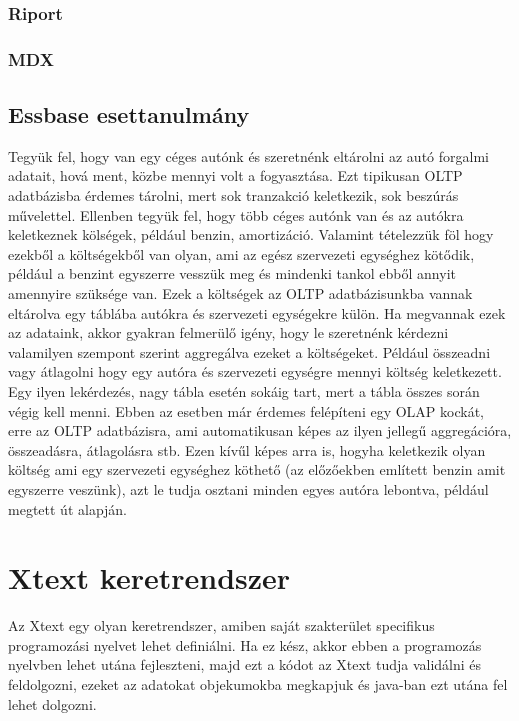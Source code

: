 \subsubsection{Riport}


\subsubsection{MDX}

\subsection{Essbase esettanulmány}
Tegyük fel, hogy van egy céges autónk és szeretnénk eltárolni az autó forgalmi adatait, hová ment, közbe mennyi volt a fogyasztása. Ezt tipikusan OLTP adatbázisba érdemes tárolni, mert sok tranzakció keletkezik, sok beszúrás művelettel. Ellenben tegyük fel, hogy több céges autónk van és az autókra keletkeznek kölségek, például benzin, amortizáció. Valamint tételezzük föl hogy ezekből a költségekből van olyan, ami az egész szervezeti egységhez kötődik, például a benzint egyszerre vesszük meg és mindenki tankol ebből annyit amennyire szüksége van. Ezek a költségek az OLTP adatbázisunkba vannak eltárolva egy táblába autókra és szervezeti egységekre külön. Ha megvannak ezek az adataink, akkor gyakran felmerülő igény, hogy le szeretnénk kérdezni valamilyen szempont szerint aggregálva ezeket a költségeket. Például összeadni vagy átlagolni hogy egy autóra és szervezeti egységre mennyi költség keletkezett. Egy ilyen lekérdezés, nagy tábla esetén sokáig tart, mert a tábla összes során végig kell menni.  Ebben az esetben már érdemes felépíteni egy OLAP kockát, erre az OLTP adatbázisra, ami automatikusan képes az ilyen jellegű aggregációra, összeadásra, átlagolásra stb. Ezen kívűl képes arra is, hogyha keletkezik olyan költség ami egy szervezeti egységhez köthető (az előzőekben említett benzin amit egyszerre veszünk), azt le tudja osztani minden egyes autóra lebontva, például megtett út alapján.

\section{Xtext keretrendszer}
Az Xtext egy olyan keretrendszer, amiben saját szakterület specifikus programozási nyelvet lehet definiálni. Ha ez kész, akkor ebben a programozás nyelvben lehet utána fejleszteni, majd ezt a kódot az Xtext tudja validálni és feldolgozni, ezeket az adatokat objekumokba megkapjuk és java-ban ezt utána fel lehet dolgozni.

